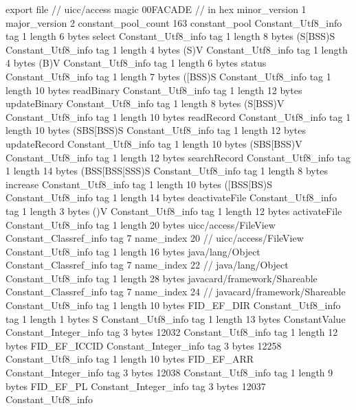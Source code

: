 export file {		// uicc/access
	magic	00FACADE		 // in hex
	minor_version	1
	major_version	2
	constant_pool_count	163
	constant_pool {
		Constant_Utf8_info {
			tag	1
			length	6
			bytes	select
		}
		Constant_Utf8_info {
			tag	1
			length	8
			bytes	(S[BSS)S
		}
		Constant_Utf8_info {
			tag	1
			length	4
			bytes	(S)V
		}
		Constant_Utf8_info {
			tag	1
			length	4
			bytes	(B)V
		}
		Constant_Utf8_info {
			tag	1
			length	6
			bytes	status
		}
		Constant_Utf8_info {
			tag	1
			length	7
			bytes	([BSS)S
		}
		Constant_Utf8_info {
			tag	1
			length	10
			bytes	readBinary
		}
		Constant_Utf8_info {
			tag	1
			length	12
			bytes	updateBinary
		}
		Constant_Utf8_info {
			tag	1
			length	8
			bytes	(S[BSS)V
		}
		Constant_Utf8_info {
			tag	1
			length	10
			bytes	readRecord
		}
		Constant_Utf8_info {
			tag	1
			length	10
			bytes	(SBS[BSS)S
		}
		Constant_Utf8_info {
			tag	1
			length	12
			bytes	updateRecord
		}
		Constant_Utf8_info {
			tag	1
			length	10
			bytes	(SBS[BSS)V
		}
		Constant_Utf8_info {
			tag	1
			length	12
			bytes	searchRecord
		}
		Constant_Utf8_info {
			tag	1
			length	14
			bytes	(BSS[BSS[SSS)S
		}
		Constant_Utf8_info {
			tag	1
			length	8
			bytes	increase
		}
		Constant_Utf8_info {
			tag	1
			length	10
			bytes	([BSS[BS)S
		}
		Constant_Utf8_info {
			tag	1
			length	14
			bytes	deactivateFile
		}
		Constant_Utf8_info {
			tag	1
			length	3
			bytes	()V
		}
		Constant_Utf8_info {
			tag	1
			length	12
			bytes	activateFile
		}
		Constant_Utf8_info {
			tag	1
			length	20
			bytes	uicc/access/FileView
		}
		Constant_Classref_info {
			tag	7
			name_index	20		// uicc/access/FileView
		}
		Constant_Utf8_info {
			tag	1
			length	16
			bytes	java/lang/Object
		}
		Constant_Classref_info {
			tag	7
			name_index	22		// java/lang/Object
		}
		Constant_Utf8_info {
			tag	1
			length	28
			bytes	javacard/framework/Shareable
		}
		Constant_Classref_info {
			tag	7
			name_index	24		// javacard/framework/Shareable
		}
		Constant_Utf8_info {
			tag	1
			length	10
			bytes	FID_EF_DIR
		}
		Constant_Utf8_info {
			tag	1
			length	1
			bytes	S
		}
		Constant_Utf8_info {
			tag	1
			length	13
			bytes	ConstantValue
		}
		Constant_Integer_info {
			tag	3
			bytes	12032
		}
		Constant_Utf8_info {
			tag	1
			length	12
			bytes	FID_EF_ICCID
		}
		Constant_Integer_info {
			tag	3
			bytes	12258
		}
		Constant_Utf8_info {
			tag	1
			length	10
			bytes	FID_EF_ARR
		}
		Constant_Integer_info {
			tag	3
			bytes	12038
		}
		Constant_Utf8_info {
			tag	1
			length	9
			bytes	FID_EF_PL
		}
		Constant_Integer_info {
			tag	3
			bytes	12037
		}
		Constant_Utf8_info {
}}}
